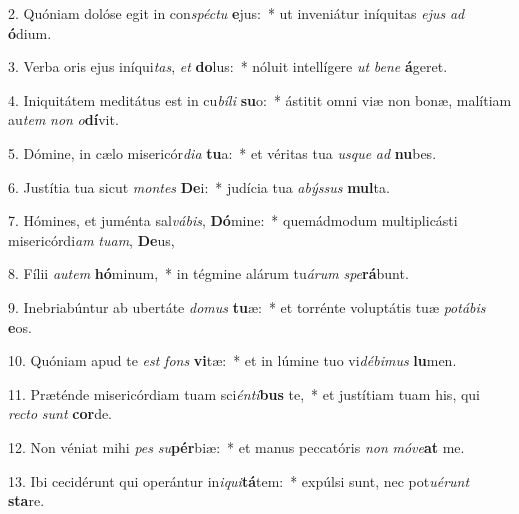 2. Quóniam dolóse egit in con\textit{spéc}\textit{tu} \textbf{e}jus:~*  ut inveniátur iníquitas \textit{e}\textit{jus} \textit{ad} \textbf{ó}dium.\

3. Verba oris ejus iníqui\textit{tas}, \textit{et} \textbf{do}lus:~*  nóluit intellígere \textit{ut} \textit{be}\textit{ne} \textbf{á}geret.\

4. Iniquitátem meditátus est in cu\textit{bí}\textit{li} \textbf{su}o:~*  ástitit omni viæ non bonæ, malítiam au\textit{tem} \textit{non} \textit{o}\textbf{dí}vit.\

5. Dómine, in cælo misericór\textit{di}\textit{a} \textbf{tu}a:~*  et véritas tua \textit{us}\textit{que} \textit{ad} \textbf{nu}bes.\

6. Justítia tua sicut \textit{mon}\textit{tes} \textbf{De}i:~*  judícia tua \textit{a}\textit{býs}\textit{sus} \textbf{mul}ta.\

7. Hómines, et juménta sal\textit{vá}\textit{bis}, \textbf{Dó}mine:~*  quemádmodum multiplicásti misericórdi\textit{am} \textit{tu}\textit{am}, \textbf{De}us,\

8. Fílii \textit{au}\textit{tem} \textbf{hó}minum,~*  in tégmine alárum tu\textit{á}\textit{rum} \textit{spe}\textbf{rá}bunt.\

9. Inebriabúntur ab ubertáte \textit{do}\textit{mus} \textbf{tu}æ:~*  et torrénte voluptátis tuæ \textit{po}\textit{tá}\textit{bis} \textbf{e}os.\

10. Quóniam apud te \textit{est} \textit{fons} \textbf{vi}tæ:~*  et in lúmine tuo vi\textit{dé}\textit{bi}\textit{mus} \textbf{lu}men.\

11. Præténde misericórdiam tuam sci\textit{én}\textit{ti}\textbf{bus} te,~*  et justítiam tuam his, qui \textit{rec}\textit{to} \textit{sunt} \textbf{cor}de.\

12. Non véniat mihi \textit{pes} \textit{su}\textbf{pér}biæ:~*  et manus peccatóris \textit{non} \textit{mó}\textit{ve}\textbf{at} me.\

13. Ibi cecidérunt qui operántur in\textit{i}\textit{qui}\textbf{tá}tem:~*  expúlsi sunt, nec pot\textit{u}\textit{é}\textit{runt} \textbf{sta}re.\

